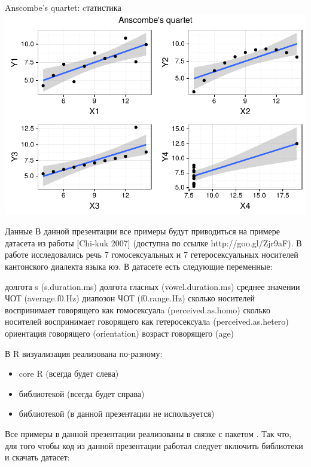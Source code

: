 \begin{frame}{Anscombe's quartet: cтатистика}
\includegraphics[width=\linewidth]{007-Anscombe-quartet.pdf}
\end{frame}
\begin{frame}{Данные}
В данной презентации все примеры будут приводиться на примере датасета из работы [Chi-kuk 2007] (доступна по ссылке http://goo.gl/Zjr9aF). В работе исследовались речь 7 гомосексуальных и 7 гетеросексуальных носителей кантонского диалекта языка юэ. В датасете есть следующие переменные:
\begin{itemize}
\mytem долгота s (s.duration.ms)
\mytem долгота гласных (vowel.duration.ms)
\mytem среднее значении ЧОТ (average.f0.Hz)
\mytem диапозон ЧОТ (f0.range.Hz)
\mytem сколько носителей воспринимает говорящего как гомосексуалa (perceived.as.homo)
\mytem сколько носителей воспринимает говорящего как гетеросексуалa (perceived.as.hetero)
\mytem ориентация говорящего (orientation)
\mytem возраст говорящего (age)
\end{itemize}
\end{frame}
\begin{frame}
В R визуализация реализована по-разному:
\begin{itemize}
\item core R (всегда будет слева)
\item библиотекой  (всегда будет справа)
\item библиотекой  (в данной презентации не используется)
\end{itemize}
Все примеры  в данной презентации реализованы в связке с пакетом . Так что, для того чтобы код из данной презентации работал следует включить библиотеки и скачать датасет:
\end{frame}
